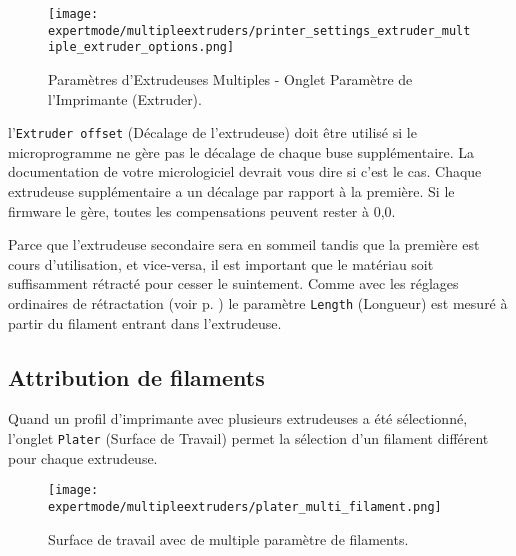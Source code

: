 \begin{figure}[H]
\centering
\texttt{[image: expertmode/multipleextruders/printer\_settings\_extruder\_multiple\_extruder\_options.png]}
\caption{Param\`etres d'Extrudeuses Multiples - Onglet Param\`etre de l'Imprimante (Extruder).}
\label{fig:printer_settings_extruder_multiple_extruder_options}
\end{figure}


l'\texttt{Extruder offset} (D\'ecalage de l'extrudeuse) doit \^etre utilis\'e si le microprogramme ne g\`ere pas le d\'ecalage de chaque buse suppl\'ementaire. La documentation de votre micrologiciel devrait vous dire si c'est le cas. Chaque extrudeuse suppl\'ementaire a un d\'ecalage par rapport \`a la premi\`ere. Si le firmware le g\`ere, toutes les compensations peuvent rester \`a 0,0.

Parce que l'extrudeuse secondaire sera en sommeil tandis que la premi\`ere est cours d'utilisation, et vice-versa, il est important que le mat\'eriau soit suffisamment r\'etract\'e pour cesser le suintement.  Comme avec les r\'eglages ordinaires de r\'etractation (voir p. \pageref{fig:retraction_settings}) le param\`etre \texttt{Length} (Longueur) est mesur\'e \`a partir du filament entrant dans l'extrudeuse.


\subsection{Attribution de filaments} %
\label{sub:assigning_filaments}
Quand un profil d'imprimante avec plusieurs extrudeuses a \'et\'e s\'electionn\'e, l'onglet \texttt{Plater} (Surface de Travail) permet la s\'election d'un filament diff\'erent pour chaque extrudeuse.

\begin{figure}[H]
\centering
\texttt{[image: expertmode/multipleextruders/plater\_multi\_filament.png]}
\caption{Surface de travail avec de multiple param\`etre de filaments.}
\label{fig:plater_multi_filament}
\end{figure}

